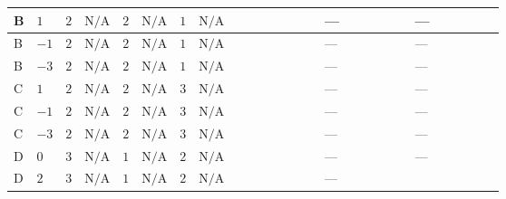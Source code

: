 \documentclass[8pt]{article}
\begin{document}
\begin{landscape}
\begin{longtable}{@{}llcccccc >{\raggedright\arraybackslash}p{0.21\linewidth} >{\raggedright\arraybackslash}p{0.21\linewidth} >{\raggedright\arraybackslash}p{0.21\linewidth}@{}}
\midrule
B & $1$ & $2$ & $\text{N/A}$ & $2$ & $\text{N/A}$ & $1$ & $\text{N/A}$ & \scriptsize\adjustbox{max width=\linewidth}{$\begin{gathered} +12 {\lambda_{S_1}^{(1)}}^2\end{gathered}$} & --- & --- \\
\midrule
B & $-1$ & $2$ & $\text{N/A}$ & $2$ & $\text{N/A}$ & $1$ & $\text{N/A}$ & \scriptsize\adjustbox{max width=\linewidth}{$\begin{gathered} +12 {\lambda_{S_1}^{(1)}}^2\end{gathered}$} & --- & --- \\
\midrule
B & $-3$ & $2$ & $\text{N/A}$ & $2$ & $\text{N/A}$ & $1$ & $\text{N/A}$ & \scriptsize\adjustbox{max width=\linewidth}{$\begin{gathered} +12 {\lambda_{S_1}^{(1)}}^2\end{gathered}$} & --- & --- \\
\midrule
C & $1$ & $2$ & $\text{N/A}$ & $2$ & $\text{N/A}$ & $3$ & $\text{N/A}$ & \scriptsize\adjustbox{max width=\linewidth}{$\begin{gathered} +12 {\lambda_{S_1}^{(1)}}^2\end{gathered}$} & --- & --- \\
\midrule
C & $-1$ & $2$ & $\text{N/A}$ & $2$ & $\text{N/A}$ & $3$ & $\text{N/A}$ & \scriptsize\adjustbox{max width=\linewidth}{$\begin{gathered} +12 {\lambda_{S_1}^{(1)}}^2\end{gathered}$} & --- & --- \\
\midrule
C & $-3$ & $2$ & $\text{N/A}$ & $2$ & $\text{N/A}$ & $3$ & $\text{N/A}$ & \scriptsize\adjustbox{max width=\linewidth}{$\begin{gathered} +12 {\lambda_{S_1}^{(1)}}^2\end{gathered}$} & --- & --- \\
\midrule
D & $0$ & $3$ & $\text{N/A}$ & $1$ & $\text{N/A}$ & $2$ & $\text{N/A}$ & \scriptsize\adjustbox{max width=\linewidth}{$\begin{gathered} +14 {\lambda_{S_1}^{(1)}}^2\end{gathered}$} & --- & --- \\
\midrule
D & $2$ & $3$ & $\text{N/A}$ & $1$ & $\text{N/A}$ & $2$ & $\text{N/A}$ & \scriptsize\adjustbox{max width=\linewidth}{$\begin{gathered} +14 {\lambda_{S_1}^{(1)}}^2\end{gathered}$} & --- & \scriptsize\adjustbox{max width=\linewidth}{$\begin{gathered} +12 {g_1}^4\end{gathered}$} \\

\end{longtable}
\end{landscape}
\end{document}
